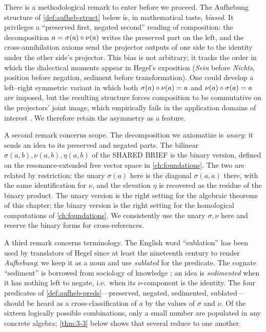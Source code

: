 There is a methodological remark to enter before we proceed. The
Aufhebung structure of \cref{def:aufheb-struct} below is, in
mathematical taste, \emph{biased}. It privileges a ``preserved
first, negated second'' reading of composition: the decomposition
$a=\sigma(a)\mathbin{\diamond}\nu(a)$ writes the preserved part on the left,
and the cross-annihilation axioms send the projector outputs of one
side to the identity under the other side's projector. This bias is
not arbitrary; it tracks the order in which the dialectical moments
appear in Hegel's exposition (\emph{Sein} before \emph{Nichts},
position before negation, sediment before transformation). One could
develop a left--right symmetric variant in which both
$\sigma(a)\mathbin{\diamond}\nu(a)=a$ and $\nu(a)\mathbin{\diamond}\sigma(a)=a$ are
imposed, but the resulting structure forces composition to be
commutative on the projectors' joint image, which empirically fails
in the application domains of interest \citep[cf.][on the asymmetry
of metaphor]{LakoffJohnson1980}. We therefore retain the asymmetry
as a feature.

A second remark concerns scope. The decomposition we axiomatize is
\emph{unary}: it sends an idea to its preserved and negated parts.
The bilinear $\sigma(a,b),\nu(a,b),\eta(a,b)$ of the SHARED BRIEF is
the binary version, defined on the resonance-extended free vector
space in \cref{ch:foundations}. The two are related by restriction:
the unary $\sigma(a)$ here is the diagonal $\sigma(a,a)$ there, with
the same identification for $\nu$, and the elevation $\eta$ is
recovered as the residue of the binary product.  The unary version
is the right setting for the algebraic theorems of this chapter; the
binary version is the right setting for the homological computations
of \cref{ch:foundations}. We consistently use the unary $\sigma,\nu$
here and reserve the binary forms for cross-references.

A third remark concerns terminology. The English word ``sublation''
has been used by translators of Hegel since at least the nineteenth
century to render \emph{Aufhebung}; we keep it as a noun and use
\emph{sublated} for the predicate. The cognate ``sediment'' is
borrowed from sociology of knowledge \citep{Lovejoy1936}; an idea is
\emph{sedimented} when it has nothing left to negate, i.e.\ when its
$\nu$-component is the identity. The four predicates of
\cref{def:aufheb-preds}---preserved, negated, sedimented, sublated---
should be heard as a cross-classification of $a$ by the values of
$\sigma$ and $\nu$. Of the sixteen logically possible
combinations, only a small number are populated in any concrete
algebra; \cref{thm:3-3} below shows that several reduce to one
another.

